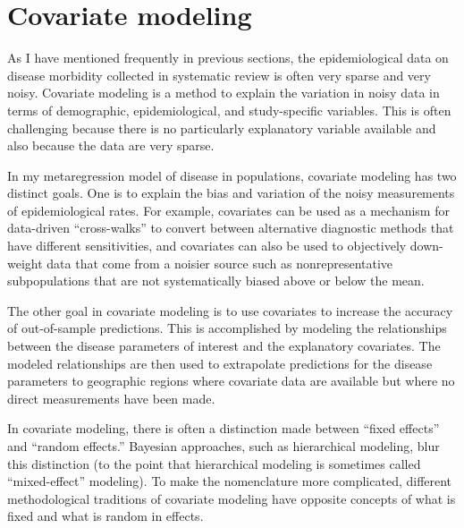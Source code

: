 \chapter{Covariate modeling}
\label{theory-covariate_modeling}
As I have mentioned frequently in previous sections, the
epidemiological data on disease morbidity collected in systematic
review is often very sparse and very noisy.
Covariate modeling is a method to explain the variation in noisy data
in terms of demographic, epidemiological, and study-specific
variables.  This is often challenging because there is no particularly
explanatory variable available and also because the data are very
sparse.


In my metaregression model of disease in populations, covariate
modeling has two distinct goals.  One is to
explain the bias and variation of the noisy measurements of
epidemiological rates.  For example, covariates can be used as a mechanism
for data-driven ``cross-walks'' to convert between alternative diagnostic methods
that have different sensitivities, and covariates can also be used to
objectively down-weight data that come from a noisier source such as
nonrepresentative subpopulations that are not systematically
biased above or below the mean.

The other goal in covariate modeling is to use covariates
to increase the accuracy of out-of-sample predictions.  This
is accomplished by modeling the relationships between the disease
parameters of interest and the explanatory covariates. The modeled
relationships are then used to extrapolate predictions for the disease
parameters to geographic regions where covariate data are available
but where no direct measurements have been made.

In covariate modeling, there is often a distinction made between
``fixed effects'' and ``random effects.''  Bayesian approaches, such
as hierarchical modeling, blur this distinction (to the point that
hierarchical modeling is sometimes called ``mixed-effect'' modeling).
\cite{Gelman_Multilevel_2005}  To make the nomenclature more
complicated, different methodological traditions of covariate modeling
have opposite concepts of what is fixed and what is random in effects.

